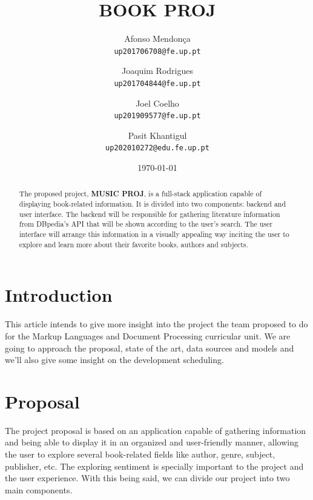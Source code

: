 \documentclass[twocolumn,twoside,11pt,a4paper]{article}
\title{\vspace{-15mm}\fontsize{24pt}{10pt}\selectfont\textbf{BOOK PROJ}} %
\author{Afonso Mendonça\\
\small \texttt{up201706708@fe.up.pt}\\
\and
Joaquim Rodrigues\\
\small \texttt{up201704844@fe.up.pt}
\vspace{-5mm}
\and
Joel Coelho\\
\small \texttt{up201909577@fe.up.pt}
\vspace{-5mm}
\and
Pasit Khantigul\\
\small \texttt{up202010272@edu.fe.up.pt}
\vspace{-5mm}
}
\date{\today}
\begin{document}
\maketitle
\thispagestyle{plain}            %


\begin{abstract}

The proposed project, \textbf{MUSIC PROJ}, is a full-stack application capable of displaying book-related information. It is divided into two components: backend and user interface. The backend will be responsible for gathering literature information from DBpedia’s API that will be shown according to the user’s search. The user interface will arrange this information in a visually appealing way inciting the user to explore and learn more about their favorite books, authors and subjects. 

\end{abstract}


\section{Introduction}\label{sec:intro}

This article intends to give more insight into the project the team proposed to do for the Markup Languages and Document Processing curricular unit. We are going to approach the proposal, state of the art, data sources and models and we’ll also give some insight on the development scheduling.


\section{Proposal}\label{sec:proposal}

The project proposal is based on an application capable of gathering information and being able to display it in an organized and user-friendly manner, allowing the user to explore several book-related fields like author, genre, subject, publisher, etc. The exploring sentiment is specially important to the project and the user experience. With this being said, we can divide our project into two main components.
\end{document}
